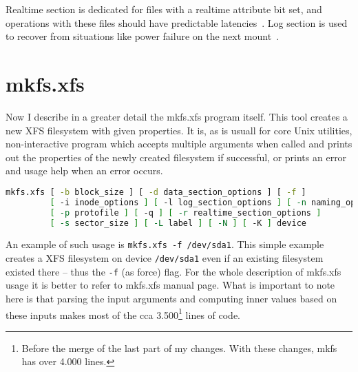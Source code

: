 Realtime section is dedicated for files with a realtime attribute bit set, and operations with these files should have predictable latencies~\cite{xfsRealtime}. Log section is used to recover from situations like power failure on the next mount~\cite{xfsStructure,xfsman}.


\section{mkfs.xfs}
Now I describe in a greater detail the mkfs.xfs program itself. This tool creates a new XFS filesystem with given properties. It is, as is usuall for core Unix utilities, non-interactive program which accepts multiple arguments when called and prints out the properties of the newly created filesystem if successful, or prints an error and usage help when an error occurs.

\begin{lstlisting}[frame=none, basicstyle=\footnotesize\ttfamily, language=Bash, numbers=none, numberstyle=\tiny\color{black},caption= {Synopsis of mkfs.xfs utility~\cite{mkfs.xfsMan}.}]
mkfs.xfs [ -b block_size ] [ -d data_section_options ] [ -f ]
         [ -i inode_options ] [ -l log_section_options ] [ -n naming_options ]
         [ -p protofile ] [ -q ] [ -r realtime_section_options ]
         [ -s sector_size ] [ -L label ] [ -N ] [ -K ] device
\end{lstlisting}

An example of such usage is {\tt mkfs.xfs -f /dev/sda1}. This simple example creates a XFS filesystem on device {\tt /dev/sda1} even if an existing filesystem existed there -- thus the {\tt -f} (as force) flag. For the whole description of mkfs.xfs usage it is better to refer to mkfs.xfs manual page. What is important to note here is that parsing the input arguments and computing inner values based on these inputs makes most of the cca 3.500\footnote{Before the merge of the last part of my changes. With these changes, mkfs has over 4.000 lines.} lines of code.






